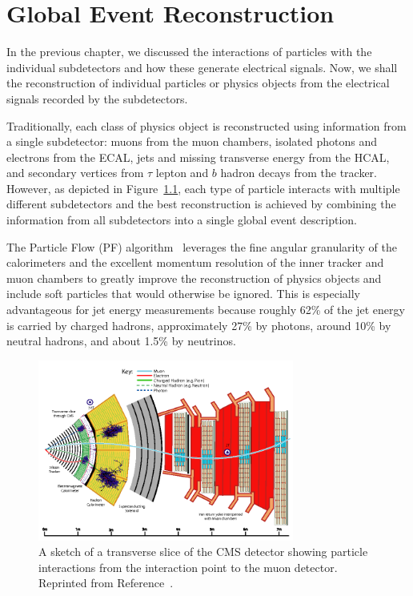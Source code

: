 \chapter{Global Event Reconstruction}

In the previous chapter, we discussed the interactions of particles with the individual subdetectors and how these generate electrical signals.
Now, we shall  the reconstruction of individual particles or physics objects from the electrical signals recorded by the subdetectors.

Traditionally, each class of physics object is reconstructed using information from a single subdetector: muons from the muon chambers, isolated photons and electrons from the ECAL, jets and missing transverse energy from the HCAL, and secondary vertices from $\tau$ lepton and $b$ hadron decays from the tracker.
However, as depicted in Figure~\ref{fig:cms_slice}, each type of particle interacts with multiple different subdetectors and the best reconstruction is achieved by combining the information from all subdetectors into a single global event description.

The Particle Flow (PF) algorithm~\cite{PF2017} leverages the fine angular granularity of the calorimeters and the excellent momentum resolution of the inner tracker and muon chambers to greatly improve the reconstruction of physics objects and include soft particles that would otherwise be ignored.
This is especially advantageous for jet energy measurements because roughly 62\% of the jet energy is carried by charged hadrons, approximately 27\% by photons, around 10\% by neutral hadrons, and about 1.5\% by neutrinos.

\begin{figure}[htbp]
  \begin{center}
    \includegraphics[width=0.75\textwidth]{Reconstruction/Figures/cms_slice.png}
    \caption{
      A sketch of a transverse slice of the CMS detector showing particle interactions from the interaction point to the muon detector.
      Reprinted from Reference~\cite{PF2017}.
    }
    \label{fig:cms_slice}
  \end{center}
\end{figure}

